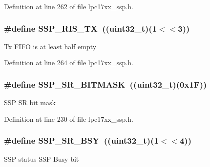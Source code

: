 \-Definition at line 262 of file lpc17xx\-\_\-ssp.\-h.

\hypertarget{group___s_s_p___private___macros_gaf2019e37460395bc0ee5fe12cd6e2226}{
\subsubsection[{\-S\-S\-P\-\_\-\-R\-I\-S\-\_\-\-T\-X}]{\setlength{\rightskip}{0pt plus 5cm}\#define {\bf \-S\-S\-P\-\_\-\-R\-I\-S\-\_\-\-T\-X}~((uint32\-\_\-t)(1$<$$<$3))}}\label{group___s_s_p___private___macros_gaf2019e37460395bc0ee5fe12cd6e2226}
\-Tx \-F\-I\-F\-O is at least half empty 

\-Definition at line 264 of file lpc17xx\-\_\-ssp.\-h.

\hypertarget{group___s_s_p___private___macros_ga0fe66130dd87296b6e16cd9fbcf7daf1}{
\subsubsection[{\-S\-S\-P\-\_\-\-S\-R\-\_\-\-B\-I\-T\-M\-A\-S\-K}]{\setlength{\rightskip}{0pt plus 5cm}\#define {\bf \-S\-S\-P\-\_\-\-S\-R\-\_\-\-B\-I\-T\-M\-A\-S\-K}~((uint32\-\_\-t)(0x1\-F))}}\label{group___s_s_p___private___macros_ga0fe66130dd87296b6e16cd9fbcf7daf1}
\-S\-S\-P \-S\-R bit mask 

\-Definition at line 230 of file lpc17xx\-\_\-ssp.\-h.

\hypertarget{group___s_s_p___private___macros_gac57c889d98458cfbde35f0ab63b499c2}{
\subsubsection[{\-S\-S\-P\-\_\-\-S\-R\-\_\-\-B\-S\-Y}]{\setlength{\rightskip}{0pt plus 5cm}\#define {\bf \-S\-S\-P\-\_\-\-S\-R\-\_\-\-B\-S\-Y}~((uint32\-\_\-t)(1$<$$<$4))}}\label{group___s_s_p___private___macros_gac57c889d98458cfbde35f0ab63b499c2}
\-S\-S\-P status \-S\-S\-P \-Busy bit 

